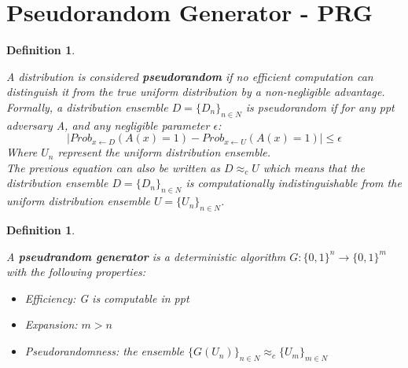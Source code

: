 \documentclass{article}
\newtheorem{defn}[thm]{Definition}
\newenvironment{definition}{\begin{defn}\begin{em}}%
{\end{em}\end{defn}}
\begin{document}
\section{Pseudorandom Generator - PRG}
\begin{definition}
A distribution is considered \textbf{pseudorandom} if no efficient computation can distinguish it from the true uniform distribution by a non-negligible advantage. Formally, a distribution ensemble $D = \{D_n\}_{n\in N}$ is pseudorandom if for any ppt adversary A, and any negligible parameter $\epsilon$:
\begin{equation}
|Prob_{x \leftarrow D} (A(x) = 1) - Prob_{x \leftarrow U} (A(x) = 1)| \leq \epsilon
\end{equation}
Where $U_n$ represent the uniform distribution ensemble.\\
The previous equation can also be written as $D \approx_c U$ which means that the distribution ensemble $D = \{D_n\}_{n\in N}$ is computationally indistinguishable from the uniform distribution ensemble $U = \{U_n\}_{n\in N}$.\\
\end{definition}

\begin{definition}
A \textbf{pseudrandom generator} is a deterministic algorithm $G: \{0,1\}^n \rightarrow \{0,1\}^m$ with the following properties:
\begin{itemize}
\item Efficiency: G is computable in ppt
\item Expansion: $m > n$
\item Pseudorandomness: the ensemble $\{G(U_n)\}_{n \in N} \approx_c \{U_m\}_{m \in N}$
\end{itemize}
\end{definition}
\end{document}
